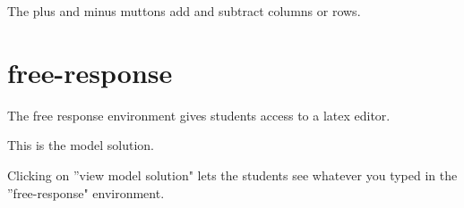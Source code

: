 \documentclass{ximera}
\begin{document}
The plus and minus muttons add and subtract columns or rows.  

\section{free-response}

The free response environment gives students access to a latex editor. 

\begin{free-response}
	This is the model solution.
\end{free-response}

Clicking on ''view model solution" lets the students see whatever you typed in the ''free-response" environment.
	
\end{document}
